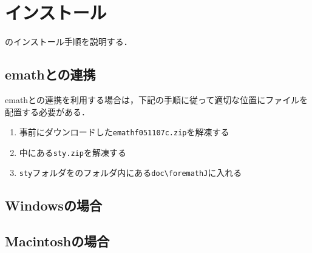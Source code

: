 \newpage

\section{インストール}

{\ketcindy}のインストール手順を説明する．

\subsection{emathとの連携}
emathとの連携を利用する場合は，下記の手順に従って適切な位置にファイルを配置する必要がある．
\begin{enumerate}
    \item 事前にダウンロードした\verb|emathf051107c.zip|を解凍する
    \item 中にある\verb|sty.zip|を解凍する
    \item \verb|sty|フォルダを{\ketcindy}のフォルダ内にある\verb|doc\foremathJ|に入れる
\end{enumerate}

\subsection{Windowsの場合}

\subsection{Macintoshの場合}



\begin{comment}
\section{基本設定}
{\ketcindy}を利用するための初期設定は，同梱の設定用ファイルを通して行う．

\cprotect\subsection{\verb|ketcindysettings.cdy|による設定}
\begin{enumerate}
    \item {\ketcindy}フォルダを開く
    \item \verb|doc|フォルダ内にある\verb|ketcindysettings.cdy|を開く
\end{enumerate}
\end{comment}